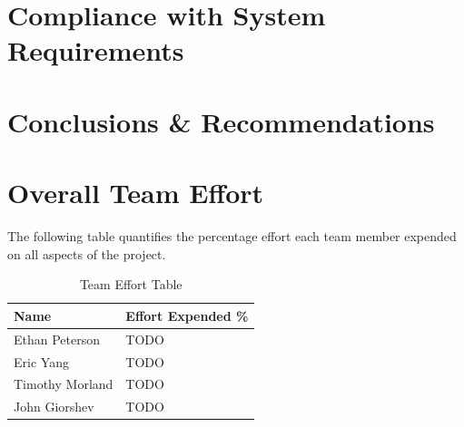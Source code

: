 \documentclass[letterpaper,12pt]{article}
\begin{document}

\section{Compliance with System Requirements} %

\section{Conclusions \& Recommendations} %

\section{Overall Team Effort}
The following table quantifies the percentage effort each team member expended
on all aspects of the project.

\begin{table}[H]
  \caption{Team Effort Table}
  \centering
  \begin{tabularx}{10cm}{l|l}
    \textbf{Name} & \textbf{Effort Expended \%}\\
    \hline
    Ethan Peterson & TODO \\
    \hline
    Eric Yang & TODO \\
    \hline
    Timothy Morland & TODO \\
    \hline
    John Giorshev & TODO \\
  \end{tabularx} 
\end{table}
\newpage
\end{document}
